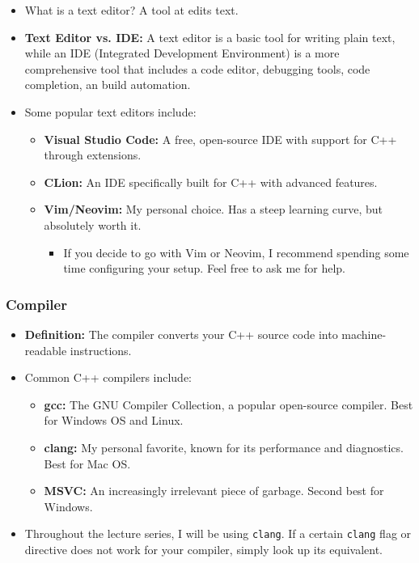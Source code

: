 \documentclass{article}
\begin{document}
\begin{itemize}
	\item What is a text editor? A tool at edits text. 
	\item \textbf{Text Editor vs. IDE:} A text editor is a basic tool for writing plain text, while an IDE (Integrated Development Environment) is a more comprehensive tool that includes a code editor, debugging tools, code completion, an build automation.
	\item Some popular text editors include:
	\begin{itemize}
		\item \textbf{Visual Studio Code:} A free, open-source IDE with support for C++ through extensions.
		\item \textbf{CLion:} An IDE specifically built for C++ with advanced features.
		\item \textbf{Vim/Neovim:} My personal choice. Has a steep learning curve, but absolutely worth it.
		\begin{itemize}
			\item If you decide to go with Vim or Neovim, I recommend spending some time configuring your setup. Feel free to ask me for help.
		\end{itemize}
	\end{itemize}
\end{itemize}

\subsubsection{Compiler}

\begin{itemize}
	\item \textbf{Definition:} The compiler converts your C++ source code into machine-readable instructions.
	\item Common C++ compilers include:
	\begin{itemize}
		\item \textbf{gcc:} The GNU Compiler Collection, a popular open-source compiler. Best for Windows OS and Linux.
		\item \textbf{clang:} My personal favorite, known for its performance and diagnostics. Best for Mac OS.
		\item \textbf{MSVC:} An increasingly irrelevant piece of garbage. Second best for Windows.
	\end{itemize}
	\item Throughout the lecture series, I will be using \texttt{clang}. If a certain \texttt{clang} flag or directive does not work for your compiler, simply look up its equivalent.
\end{itemize}
\end{document}
